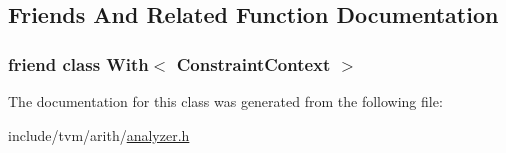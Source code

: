 \subsection{Friends And Related Function Documentation}
\subsubsection[{\texorpdfstring{With$<$ Constraint\+Context $>$}{With< ConstraintContext >}}]{\setlength{\rightskip}{0pt plus 5cm}friend class {\bf With}$<$ {\bf Constraint\+Context} $>$\hspace{0.3cm}{\ttfamily [friend]}}\hypertarget{classtvm_1_1arith_1_1ConstraintContext_acf0da349a64c42ae689d9459ae09f0e3}{}\label{classtvm_1_1arith_1_1ConstraintContext_acf0da349a64c42ae689d9459ae09f0e3}


The documentation for this class was generated from the following file\+:\begin{DoxyCompactItemize}
\item 
include/tvm/arith/\hyperlink{analyzer_8h}{analyzer.\+h}\end{DoxyCompactItemize}
